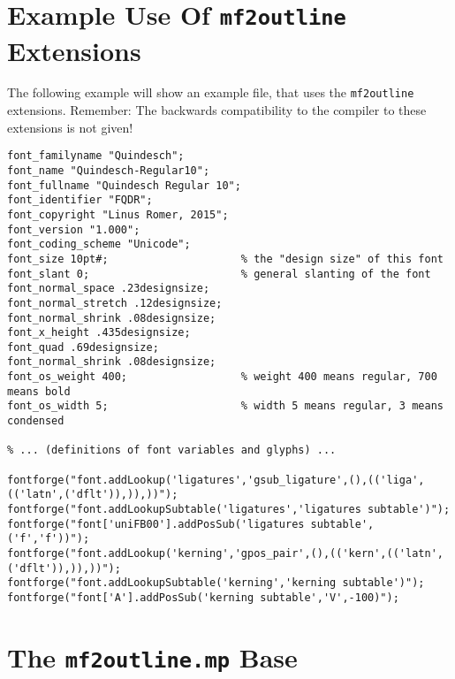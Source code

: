 \documentclass{scrartcl}
\begin{document}
\section{Example Use Of \texttt{mf2outline} Extensions}
%
The following example will show an example \MF{} file, that uses the \texttt{mf2outline} extensions. Remember: The backwards compatibility to the \MF{} compiler to these extensions is not given! 
\lstset{columns=fullflexible}
\begin{lstlisting}
font_familyname "Quindesch";
font_name "Quindesch-Regular10";
font_fullname "Quindesch Regular 10";
font_identifier "FQDR";
font_copyright "Linus Romer, 2015";
font_version "1.000";
font_coding_scheme "Unicode";
font_size 10pt#;                     % the "design size" of this font 
font_slant 0;                        % general slanting of the font   
font_normal_space .23designsize;
font_normal_stretch .12designsize;
font_normal_shrink .08designsize;
font_x_height .435designsize;
font_quad .69designsize;
font_normal_shrink .08designsize;
font_os_weight 400;                  % weight 400 means regular, 700 means bold
font_os_width 5;                     % width 5 means regular, 3 means condensed

% ... (definitions of font variables and glyphs) ...

fontforge("font.addLookup('ligatures','gsub_ligature',(),(('liga',(('latn',('dflt')),)),))");
fontforge("font.addLookupSubtable('ligatures','ligatures subtable')");
fontforge("font['uniFB00'].addPosSub('ligatures subtable',('f','f'))");
fontforge("font.addLookup('kerning','gpos_pair',(),(('kern',(('latn',('dflt')),)),))");
fontforge("font.addLookupSubtable('kerning','kerning subtable')");
fontforge("font['A'].addPosSub('kerning subtable','V',-100)");
\end{lstlisting}
%
\section{The \texttt{mf2outline.mp} Base}
%
\end{document}
